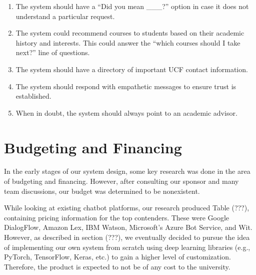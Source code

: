 \documentclass[titlepage, 12pt]{article}
\begin{document}
\begin{enumerate}
    \item The system should have a “Did you mean \_\_\_?” option in case it does not understand a particular request.
    \item The system could recommend courses to students based on their academic history and interests. This could answer the “which courses should I take next?” line of questions.
    \item The system should have a directory of important UCF contact information.
    \item The system should respond with empathetic messages to ensure trust is established.
    \item When in doubt, the system should always point to an academic advisor.
\end{enumerate}











\pagebreak
\section{Budgeting and Financing}

In the early stages of our system design, some key research was done in the area of budgeting and financing. However, after consulting our sponsor and many team discussions, our budget was determined to be nonexistent.

While looking at existing chatbot platforms, our research produced Table (???), containing pricing information for the top contenders. These were Google DialogFlow, Amazon Lex, IBM Watson, Microsoft’s Azure Bot Service, and Wit. However, as described in section (???), we eventually decided to pursue the idea of implementing our own system from scratch using deep learning libraries (e.g., PyTorch, TensorFlow, Keras, etc.) to gain a higher level of customization. Therefore, the product is expected to not be of any cost to the university.
\end{document}
